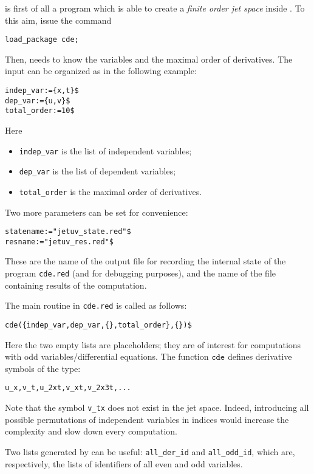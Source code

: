 \cde is first of all a program which is able to create a \emph{finite order jet
  space} inside \REDUCE. To this aim, issue the command
\begin{verbatim}
load_package cde;
\end{verbatim}
Then, \cde needs to know the variables and the maximal
order of derivatives. The input can be organized as in the following example:
\begin{verbatim}
indep_var:={x,t}$
dep_var:={u,v}$
total_order:=10$
\end{verbatim}
Here
\begin{itemize}
\item \texttt{indep\_var} is the list of independent variables;
\item \texttt{dep\_var} is the list of dependent variables;
\item \texttt{total\_order} is the maximal order of derivatives.
\end{itemize}

Two more parameters can be set for convenience:
\begin{verbatim}
statename:="jetuv_state.red"$
resname:="jetuv_res.red"$
\end{verbatim}
These are the name of the output file for recording the internal state of the
program \texttt{cde.red} (and for debugging purposes), and the name of the file
containing results of the computation.

The main routine in \texttt{cde.red} is called as follows:
\begin{verbatim}
cde({indep_var,dep_var,{},total_order},{})$
\end{verbatim}
Here the two empty lists are placeholders; they are of interest for
computations with odd variables/differential equations.
The function $\texttt{cde}$ defines derivative symbols of the type:
\begin{verbatim}
u_x,v_t,u_2xt,v_xt,v_2x3t,...
\end{verbatim}
Note that the symbol \texttt{v\_tx} does not exist in the jet space. Indeed,
introducing all possible permutations of independent variables in indices would
increase the complexity and slow down every computation.

Two lists generated by \cde can be useful: \texttt{all\_der\_id} and
\texttt{all\_odd\_id}, which are, respectively, the lists of identifiers of all
even and odd variables.


